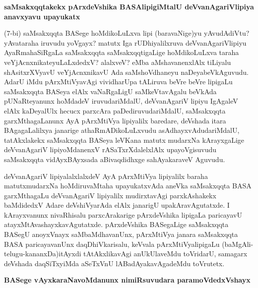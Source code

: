 \newpage

{\bigskip
\noindent
{\large\bf saMsakxqqtakekx pArxdeVshika BASAlipigiMtalU deVvanAgariVlipiya anavxyavu upayukatx}}
\medskip

\noindent
(7-bi) saMsakxqqta BASege hoMdikoLuLxva lipi (baravaNige)yu yAvu\-dAdiVtu? yAvataraha iru\-vudu yoVgayx? matutx Iga rUDhiyalilxruva deVvanAgariVlipiyu AyaRmahaSiRgaLa saMsakxqqta saMsakxqqti\-gaLige hoMdikoLuLxva taraha veYjAcnxnikateyuLaLxdedxV? alalxveV? eMba aMshavanenxlAlx tiLiyalu shAsitxrXV\-yavU veYjAcnxnikavU Ada saMshoVdhaneyu naDeyabeVkAguvudu. AdarU iMdu pArxMtiVya\-vAgi vividharUpa tALiruva beVre beVre lipigaLu saMsakxqqta BASeya elAlx vaNaRgaLigU saMkeVtavAgalu beVkAda pUNaRteyanunx hoMdadeV iruvudariMdalU, deVvanAgariV lipiyu IgAgaleV elAlx kaDe\-yalUlx hecucx parxcAra paDediruvudariMdalU, saMsakxqqta garxMthagaLanunx AyA pArxMtiVya lipiyalilx bare\-dare, deV\-shada itara BAgagaLalilxya janarige athaRmADikoLuLxvudu asAdhayxvAdudariMdalU, tatAkxlakekx saMsakxqqta
BASeya leVKana matutx mudarxNa kArayxgaLige deVvanAgariV lipiyoMdanenxV rASaTxrXdalelxlAlx upa\-yoVgisu\-vudu saMsakxqqta vidAyxBAyxsada aBivaqdidhxge sahAyakaraveV Aguvudu. 

deVvanAgariV lipiyalalxlalxdeV AyA pArxMtiVya lipiyalilx baraha matutx\break \hbox{mudarxNa} hoMdiru\-vaMtaha upayukatxvAda aneVka saMsakxqqta BASA garxMthagaLu deVva\-nAgariV lipiyalilx mudirxtavAgi parxkAshakekx baMdi\-dedxV Adare deVshiVyarAda elAlx janarigU upakAravAgutatxde. I kArayxvanunx nivaRhisalu parxcAraka\-rige pArxdeV\-shika lipigaLa paricayavU atayxMtAvashayxkavAgutatxde. pArxdeVshika BASegaLige saMsakxqqta BASegU anoyxVnayx saMbaMdhavanUnx, pArxMtiVya janara saMsakxqqta BASA paricaya\-vanUnx daqDhiVkarisalu, keVvala pArxMtiVya\-lipigaLu (baMgAli-telugu-kananxDa)\break itAyxdi tAtAkxlikavAgi anUkUlaveMdu toVridarU, sama\-garx \-deVshada daqSiTxyiMda aSeTxVnU lABadAyakavAgadeMdu toVrutetx.

{\bigskip
\noindent
{\large\bf BASege vAyxkaraNavoMdanunx nimiRsuvudara paramoVdedxVshayx}}\label{page34}
\medskip

